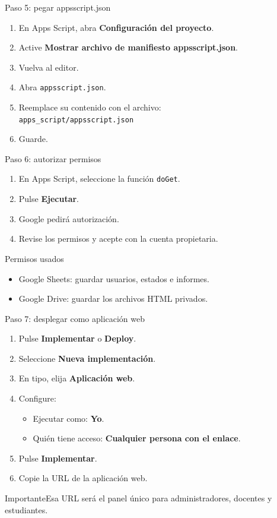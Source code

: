 \documentclass[aspectratio=169,11pt]{beamer}
\newcommand{\boton}[1]{\textcolor{azul}{\textbf{#1}}}
\newcommand{\ruta}[1]{\texttt{#1}}
\newcommand{\alertbox}[1]{\begin{block}{Importante}#1\end{block}}
\begin{document}
\begin{frame}{Paso 5: pegar appsscript.json}
\begin{enumerate}
  \item En Apps Script, abra \boton{Configuración del proyecto}.
  \item Active \boton{Mostrar archivo de manifiesto appsscript.json}.
  \item Vuelva al editor.
  \item Abra \ruta{appsscript.json}.
  \item Reemplace su contenido con el archivo:\\
  \ruta{apps\_script/appsscript.json}
  \item Guarde.
\end{enumerate}
\end{frame}

\begin{frame}{Paso 6: autorizar permisos}
\begin{enumerate}
  \item En Apps Script, seleccione la función \ruta{doGet}.
  \item Pulse \boton{Ejecutar}.
  \item Google pedirá autorización.
  \item Revise los permisos y acepte con la cuenta propietaria.
\end{enumerate}
\begin{block}{Permisos usados}
\begin{itemize}
  \item Google Sheets: guardar usuarios, estados e informes.
  \item Google Drive: guardar los archivos HTML privados.
\end{itemize}
\end{block}
\end{frame}

\begin{frame}{Paso 7: desplegar como aplicación web}
\begin{enumerate}
  \item Pulse \boton{Implementar} o \boton{Deploy}.
  \item Seleccione \boton{Nueva implementación}.
  \item En tipo, elija \boton{Aplicación web}.
  \item Configure:
  \begin{itemize}
    \item Ejecutar como: \boton{Yo}.
    \item Quién tiene acceso: \boton{Cualquier persona con el enlace}.
  \end{itemize}
  \item Pulse \boton{Implementar}.
  \item Copie la URL de la aplicación web.
\end{enumerate}
\alertbox{Esa URL será el panel único para administradores, docentes y estudiantes.}
\end{frame}
\end{document}
